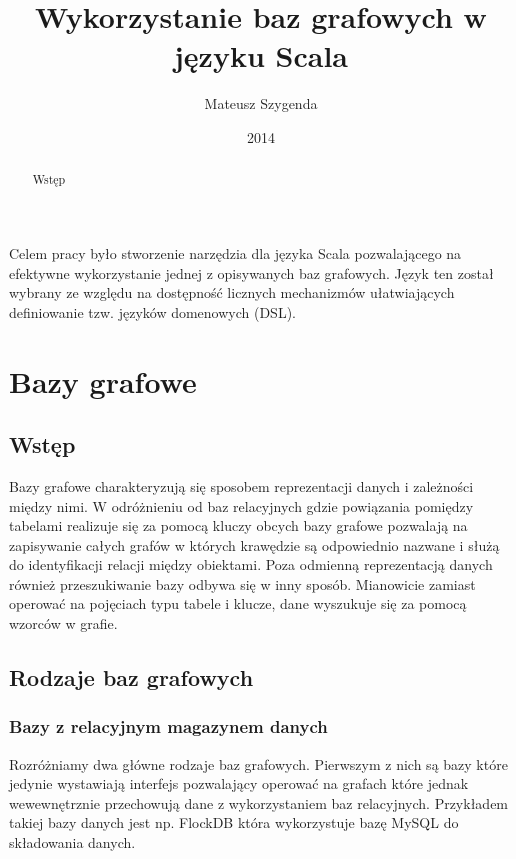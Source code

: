 \documentclass[brudnopis]{xmgr}
\author   {Mateusz Szygenda}
\title    {Wykorzystanie baz grafowych w języku Scala}
\date     {2014}
\begin{document}
\begin{abstract}
Wstęp
\end{abstract}

\maketitle

%
\introduction

Celem pracy było stworzenie narzędzia dla języka Scala pozwalającego na efektywne wykorzystanie jednej z opisywanych baz grafowych. Język ten został wybrany ze względu na dostępność licznych mechanizmów ułatwiających definiowanie tzw. języków domenowych (DSL). 

\chapter{Bazy grafowe}

\section{Wstęp}

Bazy grafowe charakteryzują się sposobem reprezentacji danych i zależności między nimi. W odróżnieniu od baz relacyjnych gdzie powiązania pomiędzy tabelami realizuje się za pomocą kluczy obcych bazy grafowe pozwalają na zapisywanie całych grafów w których krawędzie są odpowiednio nazwane i służą do identyfikacji relacji między obiektami. Poza odmienną reprezentacją danych również przeszukiwanie bazy odbywa się w inny sposób. Mianowicie zamiast operować na pojęciach typu tabele i klucze, dane wyszukuje się za pomocą wzorców w grafie.

\section{Rodzaje baz grafowych}

\subsection{Bazy z relacyjnym magazynem danych}
Rozróżniamy dwa główne rodzaje baz grafowych. Pierwszym z nich są bazy które jedynie wystawiają interfejs pozwalający operować na grafach które jednak wewewnętrznie przechowują dane z wykorzystaniem baz relacyjnych. Przykładem takiej bazy danych jest np. FlockDB która wykorzystuje bazę MySQL do składowania danych.
\end{document}

